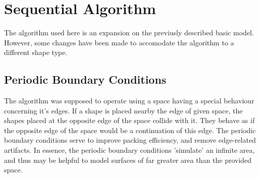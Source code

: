 \documentclass[12pt, oneside]{report}
\begin{document}
\section {Sequential Algorithm}

The algorithm used here is an expansion on the previusly described basic model. However, some changes have been made to accomodate the algorithm to a different shape type.

\subsection{Periodic Boundary Conditions}

The algorithm was supposed to operate using a space having a special behaviour concerning it's edges. If a shape is placed nearby the edge of given space, the shapes placed at the opposite edge of the space collide with it. They behave as if the opposite edge of the space would be a continuation of this edge. The periodic boundary conditions serve to improve packing efficiency, and remove edge-related artifacts. In essence, the periodic boundary conditions 'simulate' an infinite area, and thus may be helpful to model surfaces of far greater area than the provided space\cite{ciesla_mziff}.
\end{document}
